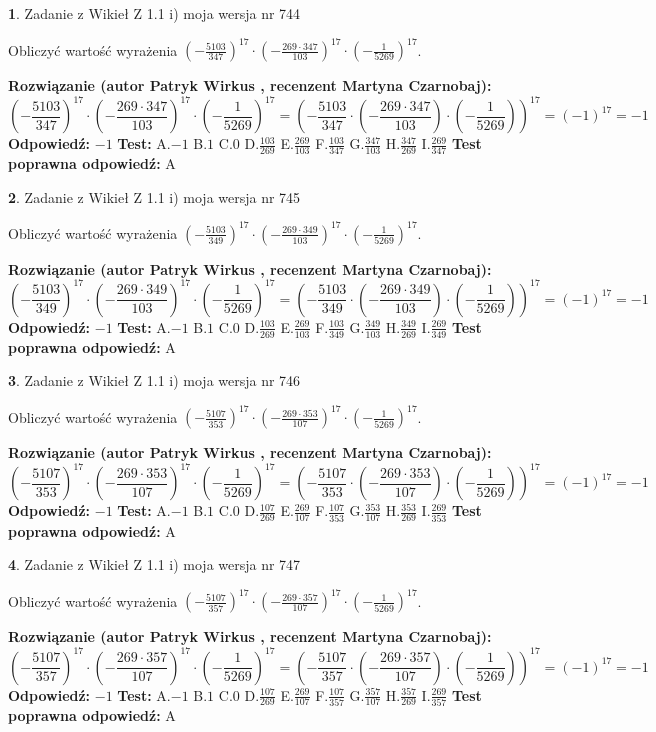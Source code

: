 \documentclass[12pt, a4paper]{article}
\theoremstyle{definition} %
\newtheorem{zad}{}
\newcommand{\zadStart}[1]{\begin{zad}#1\newline}
\newcommand{\zadStop}{\end{zad}}
\newcommand{\rozwStart}[2]{\noindent \textbf{Rozwiązanie (autor #1 , recenzent #2): }\newline}
\newcommand{\rozwStop}{\newline}
\newcommand{\odpStart}{\noindent \textbf{Odpowiedź:}\newline}
\newcommand{\odpStop}{\newline}
\newcommand{\testStart}{\noindent \textbf{Test:}\newline}
\newcommand{\testStop}{\newline}
\newcommand{\kluczStart}{\noindent \textbf{Test poprawna odpowiedź:}\newline}
\newcommand{\kluczStop}{\newline}
\begin{document}
\zadStart{Zadanie z Wikieł Z 1.1 i) moja wersja nr 744}

Obliczyć wartość wyrażenia $(-\frac{5103}{347})^{17} \cdot (-\frac{269 \cdot 347}{103})^{17} \cdot (-\frac{1}{5269})^{17}$.
\zadStop
\rozwStart{Patryk Wirkus}{Martyna Czarnobaj}
$$(-\frac{5103}{347})^{17} \cdot (-\frac{269 \cdot 347}{103})^{17} \cdot (-\frac{1}{5269})^{17} = (-\frac{5103}{347} \cdot (-\frac{269 \cdot 347}{103}) \cdot (-\frac{1}{5269}))^{17} = (-1)^{17} = -1$$
\rozwStop
\odpStart
$-1$
\odpStop
\testStart
A.$-1$ B.$1$ C.$0$ D.$\frac{103}{269}$ E.$\frac{269}{103}$
F.$\frac{103}{347}$ G.$\frac{347}{103}$
H.$\frac{347}{269}$
I.$\frac{269}{347}$
\testStop
\kluczStart
A
\kluczStop



\zadStart{Zadanie z Wikieł Z 1.1 i) moja wersja nr 745}

Obliczyć wartość wyrażenia $(-\frac{5103}{349})^{17} \cdot (-\frac{269 \cdot 349}{103})^{17} \cdot (-\frac{1}{5269})^{17}$.
\zadStop
\rozwStart{Patryk Wirkus}{Martyna Czarnobaj}
$$(-\frac{5103}{349})^{17} \cdot (-\frac{269 \cdot 349}{103})^{17} \cdot (-\frac{1}{5269})^{17} = (-\frac{5103}{349} \cdot (-\frac{269 \cdot 349}{103}) \cdot (-\frac{1}{5269}))^{17} = (-1)^{17} = -1$$
\rozwStop
\odpStart
$-1$
\odpStop
\testStart
A.$-1$ B.$1$ C.$0$ D.$\frac{103}{269}$ E.$\frac{269}{103}$
F.$\frac{103}{349}$ G.$\frac{349}{103}$
H.$\frac{349}{269}$
I.$\frac{269}{349}$
\testStop
\kluczStart
A
\kluczStop



\zadStart{Zadanie z Wikieł Z 1.1 i) moja wersja nr 746}

Obliczyć wartość wyrażenia $(-\frac{5107}{353})^{17} \cdot (-\frac{269 \cdot 353}{107})^{17} \cdot (-\frac{1}{5269})^{17}$.
\zadStop
\rozwStart{Patryk Wirkus}{Martyna Czarnobaj}
$$(-\frac{5107}{353})^{17} \cdot (-\frac{269 \cdot 353}{107})^{17} \cdot (-\frac{1}{5269})^{17} = (-\frac{5107}{353} \cdot (-\frac{269 \cdot 353}{107}) \cdot (-\frac{1}{5269}))^{17} = (-1)^{17} = -1$$
\rozwStop
\odpStart
$-1$
\odpStop
\testStart
A.$-1$ B.$1$ C.$0$ D.$\frac{107}{269}$ E.$\frac{269}{107}$
F.$\frac{107}{353}$ G.$\frac{353}{107}$
H.$\frac{353}{269}$
I.$\frac{269}{353}$
\testStop
\kluczStart
A
\kluczStop



\zadStart{Zadanie z Wikieł Z 1.1 i) moja wersja nr 747}

Obliczyć wartość wyrażenia $(-\frac{5107}{357})^{17} \cdot (-\frac{269 \cdot 357}{107})^{17} \cdot (-\frac{1}{5269})^{17}$.
\zadStop
\rozwStart{Patryk Wirkus}{Martyna Czarnobaj}
$$(-\frac{5107}{357})^{17} \cdot (-\frac{269 \cdot 357}{107})^{17} \cdot (-\frac{1}{5269})^{17} = (-\frac{5107}{357} \cdot (-\frac{269 \cdot 357}{107}) \cdot (-\frac{1}{5269}))^{17} = (-1)^{17} = -1$$
\rozwStop
\odpStart
$-1$
\odpStop
\testStart
A.$-1$ B.$1$ C.$0$ D.$\frac{107}{269}$ E.$\frac{269}{107}$
F.$\frac{107}{357}$ G.$\frac{357}{107}$
H.$\frac{357}{269}$
I.$\frac{269}{357}$
\testStop
\kluczStart
A
\kluczStop
\end{document}
